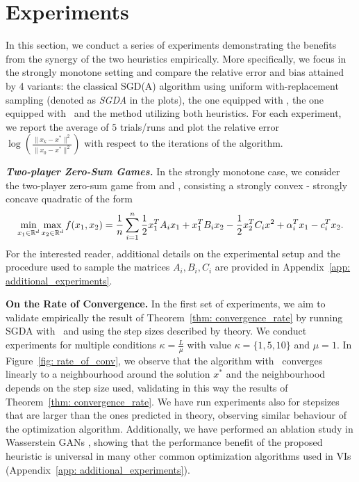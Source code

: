 

\section{Experiments}\vspace{-.25em}
In this section, we conduct a series of experiments demonstrating the benefits from the synergy of the two heuristics empirically. 
More specifically, we focus in the strongly monotone setting and compare the relative error and bias attained by 4 variants: the classical SGD(A) algorithm using uniform with-replacement sampling (denoted as \emph{SGDA} in the plots), the one equipped with \RRresh, the one equipped with \RRrom\ and the method utilizing both heuristics. 
For each experiment, we report the average of $5$ trials/runs and plot the relative error $\log\left(\frac{\|x_k - x^*\|^2}{\|x_0 - x^*\|^2}\right)$ with respect to the iterations of the algorithm.

\textbf{\textit{Two-player Zero-Sum Games.}} In the strongly monotone case, we consider the two-player zero-sum game from \cite{emmanouilidis2024stochastic} and \cite{loizou2021stochastic}, consisting a strongly convex - strongly concave quadratic of the form
\begin{eqnarray}
    \min_{x_{1} \in \mathbb{R}^d} \max_{x_{2}\in \mathbb{R}^d} f(x_1, x_2) = \frac{1}{n} \sum_{i=1}^{n} \frac{1}{2} x_1^T A_i x_1 + x_1^T B_i x_2 - \frac{1}{2} x_2^T C_i x^2 + \alpha_i^T x_1 - c_i^T x_2. \nonumber
\end{eqnarray}
For the interested reader, additional details on the experimental setup and the procedure used to sample the matrices $A_i, B_i, C_i$ are provided in Appendix~\ref{app: additional_experiments}.

\textbf{On the Rate of Convergence.} In the first set of experiments, we aim to validate empirically the result of Theorem~\ref{thm: convergence_rate} by running SGDA with \RRresh\ and using the step sizes described by theory. We conduct experiments for multiple conditions $\kappa = \frac{L}{\mu}$ with value $\kappa = \{1, 5, 10\}$ and $\mu = 1$. In Figure~\ref{fig: rate_of_conv}, we observe that the algorithm with \RRresh\ converges linearly to a neighbourhood around the solution $x^*$ and the neighbourhood depends on the step size used, validating in this way the results of Theorem~\ref{thm: convergence_rate}. We have run experiments also for stepsizes that are larger than the ones predicted in theory, observing similar behaviour of the optimization algorithm. Additionally, we have performed an ablation study in Wasserstein GANs \citep{emmanouilidis2024stochastic, daskalakis2017training}, showing that the performance benefit of the proposed heuristic is universal in many other common optimization algorithms used in VIs (Appendix~\ref{app: additional_experiments}).

